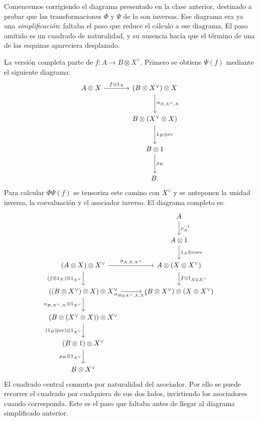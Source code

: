Comencemos corrigiendo el diagrama presentado en la clase anterior, destinado a probar que las transformaciones $\Phi$ y $\Psi$ de la  son inversas. Ese diagrama era ya una \emph{simplificación}: faltaba el paso que reduce el cálculo a ese diagrama. El paso omitido es un cuadrado de naturalidad, y su ausencia hacía que el término de una de las esquinas apareciera desplazado.

La versión completa parte de $f\colon A\to B\otimes X^\vee$. Primero se obtiene $\Psi(f)$ mediante el siguiente diagrama:
\[
\begin{tikzcd}[column sep=large,row sep=large]
A\otimes X \arrow[r,"{f\otimes1_X}"]
 & (B\otimes X^\vee)\otimes X \arrow[d,"{\alpha_{B,X^\vee,X}}"]\\
 & B\otimes(X^\vee\otimes X) \arrow[d,"{1_B\otimes\mathrm{ev}}"]\\
 & B\otimes1 \arrow[d,"{\rho_B}"]\\
 & B .
\end{tikzcd}
\]
Para calcular $\Phi\Psi(f)$ se tensoriza este camino con $X^\vee$ y se anteponen la unidad inversa, la coevaluación y el asociador inverso. El diagrama completo es:
\[
\begin{tikzcd}[column sep=3em,row sep=2em]
 & A \arrow[d,"{\rho_A^{-1}}"]\\
 & A\otimes1 \arrow[d,"{1_A\otimes\mathrm{coev}}"]\\
(A\otimes X)\otimes X^\vee
 \arrow[r,"{\alpha_{A,X,X^\vee}}"]
 \arrow[d,"{(f\otimes1_X)\otimes1_{X^\vee}}"']
 & A\otimes(X\otimes X^\vee)
 \arrow[d,"{f\otimes1_{X\otimes X^\vee}}"]\\
((B\otimes X^\vee)\otimes X)\otimes X^\vee
 \arrow[r,"{\alpha_{B\otimes X^\vee,X,X^\vee}}"']
 \arrow[d,"{\alpha_{B,X^\vee,X}\otimes1_{X^\vee}}"']
 & (B\otimes X^\vee)\otimes(X\otimes X^\vee)\\
(B\otimes(X^\vee\otimes X))\otimes X^\vee
 \arrow[d,"{(1_B\otimes\mathrm{ev})\otimes1_{X^\vee}}"'] &\\
(B\otimes1)\otimes X^\vee \arrow[d,"{\rho_B\otimes1_{X^\vee}}"'] &\\
B\otimes X^\vee &
\end{tikzcd}
\]
El cuadrado central conmuta por naturalidad del asociador. Por ello se puede recorrer el cuadrado por cualquiera de sus dos lados, invirtiendo los asociadores cuando corresponda. Este es el paso que faltaba antes de llegar al diagrama simplificado anterior.

